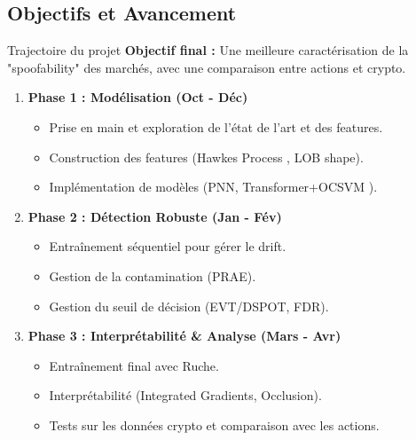 \documentclass{beamer}
\begin{document}
\subsection{Objectifs et Avancement}
\begin{frame}{Trajectoire du projet}
    \textbf{Objectif final :} Une meilleure caractérisation de la "spoofability" des marchés, avec une comparaison entre actions et crypto.

    \vspace{0.2cm}
    \begin{enumerate}
        \item \textbf{Phase 1 : Modélisation (Oct - Déc)}
        \begin{itemize}
            \item Prise en main et exploration de l'état de l'art et des features.
            \item Construction des features (Hawkes Process \cite{fabre_2025}, LOB shape).
            \item Implémentation de modèles (PNN, Transformer+OCSVM \cite{poutre_2024}).
        \end{itemize}
        \item \textbf{Phase 2 : Détection Robuste (Jan - Fév)}
        \begin{itemize}
            \item Entraînement séquentiel pour gérer le drift.
            \item Gestion de la contamination (PRAE).
            \item Gestion du seuil de décision (EVT/DSPOT, FDR).
        \end{itemize}
        \item \textbf{Phase 3 : Interprétabilité \& Analyse (Mars - Avr)}
        \begin{itemize}
            \item Entraînement final avec Ruche.
            \item Interprétabilité (Integrated Gradients, Occlusion).
            \item Tests sur les données crypto et comparaison avec les actions.
        \end{itemize}
    \end{enumerate}
\end{frame}
\end{document}
